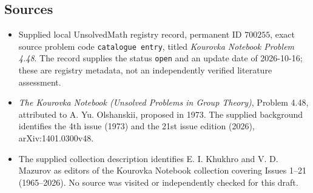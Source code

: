 \documentclass[11pt]{article}
\begin{document}
\subsection{Sources}
\begin{itemize}
\item Supplied local UnsolvedMath registry record, permanent ID \(700255\), exact source problem code \texttt{catalogue entry}, titled \emph{Kourovka Notebook Problem 4.48}. The record supplies the status \texttt{open} and an update date of 2026-10-16; these are registry metadata, not an independently verified literature assessment.
\item \emph{The Kourovka Notebook (Unsolved Problems in Group Theory)}, Problem 4.48, attributed to A. Yu. Olshanskii, proposed in 1973. The supplied background identifies the 4th issue (1973) and the 21st issue edition (2026), arXiv:1401.0300v48.
\item The supplied collection description identifies E. I. Khukhro and V. D. Mazurov as editors of the Kourovka Notebook collection covering Issues 1--21 (1965--2026). No source was visited or independently checked for this draft.
\end{itemize}
\end{document}
